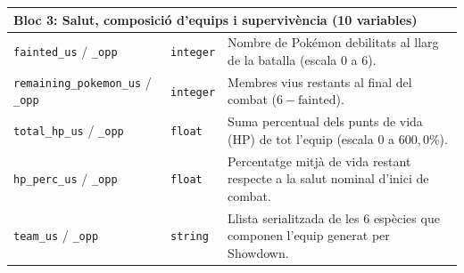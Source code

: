 \begin{table}[htbp]
\begin{tabularx}{\textwidth}{lp{1.8cm}>{\raggedright\arraybackslash}X}
\midrule
\multicolumn{3}{l}{\textbf{Bloc 3: Salut, composició d'equips i supervivència (10 variables)}} \\
\midrule
\texttt{fainted\_us} / \texttt{\_opp} & \texttt{integer} & Nombre de Pokémon debilitats al llarg de la batalla (escala $0$ a $6$). \\
\texttt{remaining\_pokemon\_us} / \texttt{\_opp} & \texttt{integer} & Membres vius restants al final del combat ($6 - \text{fainted}$). \\
\texttt{total\_hp\_us} / \texttt{\_opp} & \texttt{float} & Suma percentual dels punts de vida (HP) de tot l'equip (escala $0$ a $600{,}0\%$). \\
\texttt{hp\_perc\_us} / \texttt{\_opp} & \texttt{float} & Percentatge mitjà de vida restant respecte a la salut nominal d'inici de combat. \\
\texttt{team\_us} / \texttt{\_opp} & \texttt{string} & Llista serialitzada de les 6 espècies que componen l'equip generat per Showdown. \\
\bottomrule
\end{tabularx}
\end{table}

